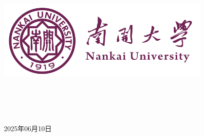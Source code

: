 \documentclass[a4paper]{article}
\begin{document}
\renewcommand{\contentsname}{目\ 录}
\renewcommand{\appendixname}{附录}
\renewcommand{\appendixpagename}{附录}
\renewcommand{\refname}{参考文献}
\renewcommand{\figurename}{图}
\renewcommand{\tablename}{表}

\begin{titlepage}
    \begin{center}
    \includegraphics[width=0.8\textwidth]{NKU.png}\\[1cm]
    \vspace{20mm}
		\textbf{\huge\textbf{}}\\[0.5cm]
		\textbf{\huge{}}\\[2.3cm]
		\textbf{\Huge\textbf{}}

		\vspace{\fill}

    \centering
    \textsc{\LARGE {}}\\[0.5cm]
    \textsc{\LARGE {}}\\[0.5cm]
    
    \vfill
    {\Large 2025年06月10日}
    \end{center}
\end{titlepage}
\end{document}
